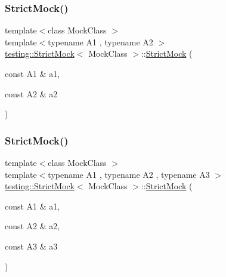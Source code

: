 \mbox{\label{classtesting_1_1_strict_mock_a345933f3f1a10de381a508f93e680c6b}} 
\subsubsection{\texorpdfstring{StrictMock()}{StrictMock()}\hspace{0.1cm}{\footnotesize\ttfamily [9/17]}}
{\footnotesize\ttfamily template$<$class Mock\+Class $>$ \\
template$<$typename A1 , typename A2 $>$ \\
\mbox{\hyperlink{classtesting_1_1_strict_mock}{testing\+::\+Strict\+Mock}}$<$ Mock\+Class $>$\+::\mbox{\hyperlink{classtesting_1_1_strict_mock}{Strict\+Mock}} (\begin{DoxyParamCaption}\item[{const A1 \&}]{a1,  }\item[{const A2 \&}]{a2 }\end{DoxyParamCaption})\hspace{0.3cm}{\ttfamily [inline]}}

\mbox{\label{classtesting_1_1_strict_mock_acc25729cd85a3a412106863894a30fe7}} 
\subsubsection{\texorpdfstring{StrictMock()}{StrictMock()}\hspace{0.1cm}{\footnotesize\ttfamily [10/17]}}
{\footnotesize\ttfamily template$<$class Mock\+Class $>$ \\
template$<$typename A1 , typename A2 , typename A3 $>$ \\
\mbox{\hyperlink{classtesting_1_1_strict_mock}{testing\+::\+Strict\+Mock}}$<$ Mock\+Class $>$\+::\mbox{\hyperlink{classtesting_1_1_strict_mock}{Strict\+Mock}} (\begin{DoxyParamCaption}\item[{const A1 \&}]{a1,  }\item[{const A2 \&}]{a2,  }\item[{const A3 \&}]{a3 }\end{DoxyParamCaption})\hspace{0.3cm}{\ttfamily [inline]}}

